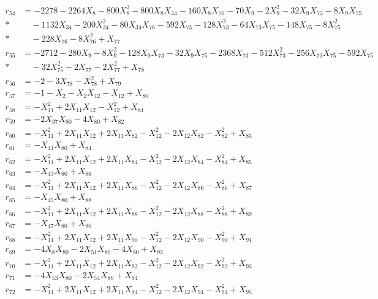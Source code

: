 \begin{align*}
r_{54} &= -2278 - 2264X_{8} - 800X_{8}^{2} - 800X_{8}X_{34} - 160X_{8}X_{76} - 70X_{9} - 2X_{9}^{2} - 32X_{9}X_{73} - 8X_{9}X_{75} \\*
&\quad  - 1132X_{34} - 200X_{34}^{2} - 80X_{34}X_{76} - 592X_{73} - 128X_{73}^{2} - 64X_{73}X_{75} - 148X_{75} - 8X_{75}^{2} \\*
&\quad  - 228X_{76} - 8X_{76}^{2} + X_{77} \\[3pt]
r_{55} &= -2712 - 280X_{9} - 8X_{9}^{2} - 128X_{9}X_{73} - 32X_{9}X_{75} - 2368X_{73} - 512X_{73}^{2} - 256X_{73}X_{75} - 592X_{75} \\*
&\quad  - 32X_{75}^{2} - 2X_{77} - 2X_{77}^{2} + X_{78} \\[3pt]
r_{56} &= -2 - 3X_{78} - X_{78}^{2} + X_{79} \\[3pt]
r_{57} &= -1 - X_{2} - X_{2}X_{12} - X_{12} + X_{80} \\[3pt]
r_{58} &= -X_{11}^{2} + 2X_{11}X_{12} - X_{12}^{2} + X_{81} \\[3pt]
r_{59} &= -2X_{37}X_{80} - 4X_{80} + X_{82} \\[3pt]
r_{60} &= -X_{11}^{2} + 2X_{11}X_{12} + 2X_{11}X_{82} - X_{12}^{2} - 2X_{12}X_{82} - X_{82}^{2} + X_{83} \\[3pt]
r_{61} &= -X_{41}X_{80} + X_{84} \\[3pt]
r_{62} &= -X_{11}^{2} + 2X_{11}X_{12} + 2X_{11}X_{84} - X_{12}^{2} - 2X_{12}X_{84} - X_{84}^{2} + X_{85} \\[3pt]
r_{63} &= -X_{43}X_{80} + X_{86} \\[3pt]
r_{64} &= -X_{11}^{2} + 2X_{11}X_{12} + 2X_{11}X_{86} - X_{12}^{2} - 2X_{12}X_{86} - X_{86}^{2} + X_{87} \\[3pt]
r_{65} &= -X_{45}X_{80} + X_{88} \\[3pt]
r_{66} &= -X_{11}^{2} + 2X_{11}X_{12} + 2X_{11}X_{88} - X_{12}^{2} - 2X_{12}X_{88} - X_{88}^{2} + X_{89} \\[3pt]
r_{67} &= -X_{47}X_{80} + X_{90} \\[3pt]
r_{68} &= -X_{11}^{2} + 2X_{11}X_{12} + 2X_{11}X_{90} - X_{12}^{2} - 2X_{12}X_{90} - X_{90}^{2} + X_{91} \\[3pt]
r_{69} &= -4X_{8}X_{80} - 2X_{51}X_{80} - 4X_{80} + X_{92} \\[3pt]
r_{70} &= -X_{11}^{2} + 2X_{11}X_{12} + 2X_{11}X_{92} - X_{12}^{2} - 2X_{12}X_{92} - X_{92}^{2} + X_{93} \\[3pt]
r_{71} &= -4X_{53}X_{80} - 2X_{54}X_{80} + X_{94} \\[3pt]
r_{72} &= -X_{11}^{2} + 2X_{11}X_{12} + 2X_{11}X_{94} - X_{12}^{2} - 2X_{12}X_{94} - X_{94}^{2} + X_{95} \\[3pt]

\end{align*}
